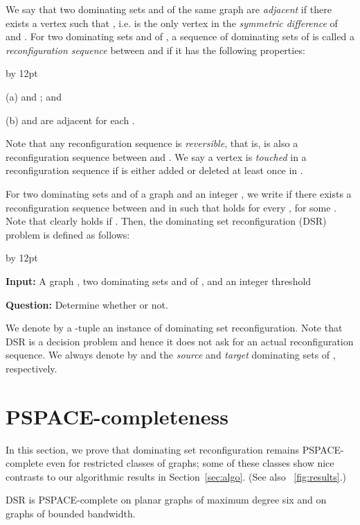 \documentclass{llncs}
\newenvironment{listing}[1]{\begin{list}{*}{\settowidth{\labelwidth}{#1}\setlength{\leftmargin}{\labelwidth}\advance \leftmargin by 12pt
\setlength{\itemsep}{0pt}\setlength{\parsep}{0pt}\setlength{\topsep}{0pt}\setlength{\parskip}{0pt}}}{\end{list}}
\begin{document}
We say that two dominating sets  and  of the same graph 
are {\em adjacent} if there exists a vertex  such that
,
i.e.  is the only vertex in the {\em symmetric difference} of  and .
For two dominating sets  and  of , a sequence  of
dominating sets of  is called a {\em reconfiguration sequence} between  and  if it has the following properties:
\begin{listing}{aaa}
\item[(a)]  and ; and
\item[(b)]  and  are adjacent for each .
\end{listing}
Note that any reconfiguration sequence is {\em reversible}, that is,  is
also a reconfiguration sequence between  and .
We say a vertex  is {\em touched} in a reconfiguration
sequence  if  is either added or deleted at least once in .

For two dominating sets  and  of a graph  and an integer , we
write  if there exists a reconfiguration sequence 
between  and  in  such that  holds for every , for some .
Note that  clearly holds if .
Then, the {\sc dominating set reconfiguration (DSR)} problem is defined as follows:	
\begin{center}
	\parbox{0.85\hsize}{
\begin{listing}{{\bf Question:}}
	\item[{\bf Input:}] A graph , two dominating sets  and  of , and an integer threshold 
	\item[{\bf Question:}] Determine whether  or not.
	\end{listing}}
\end{center}
We denote by a -tuple  an instance of {\sc dominating set reconfiguration}.
Note that {\sc DSR} is a decision problem and hence it does not ask for an actual reconfiguration sequence.
We always denote by  and  the {\em source} and {\em target} dominating sets of , respectively.

\section{PSPACE-completeness}\label{sec:hardness}

In this section, we prove that {\sc dominating set reconfiguration} remains PSPACE-complete even for restricted classes of graphs;
some of these classes show nice contrasts to our algorithmic results in Section~\ref{sec:algo}.
(See also \figurename~\ref{fig:results}.)

\begin{theorem}\label{the:hardness1}
{\sc DSR} is PSPACE-complete on planar graphs of maximum degree six and on graphs of bounded bandwidth.
\end{theorem}
\end{document}
